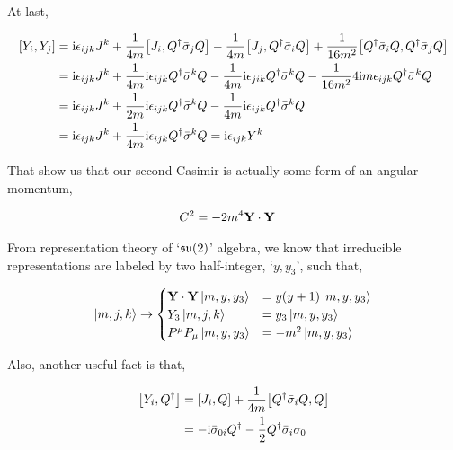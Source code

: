 At last,

\begin{align}
    \comm{Y_i}{Y_j}&=\im\epsilon_{ijk}J^k+\frac{1}{4m}\comm{J_i}{Q^\dagger{\bar\sigma}_j Q}-\frac{1}{4m}\comm{J_j}{Q^\dagger{\bar\sigma}_i Q}+\frac{1}{16m^2}\comm{Q^\dagger{\bar\sigma}_i Q}{Q^\dagger{\bar\sigma}_j Q}\nonumber\\
    &=\im\epsilon_{ijk}J^k+\frac{1}{4m}\im\epsilon_{ijk}Q^\dagger{\bar\sigma^k}Q-\frac{1}{4m}\im\epsilon_{jik}Q^\dagger{\bar\sigma^k}Q-\frac{1}{16m^2}4\im  m\epsilon_{ijk}Q^\dagger{\bar\sigma}^kQ\nonumber\\
    &=\im\epsilon_{ijk}J^k+\frac{1}{2m}\im\epsilon_{ijk}Q^\dagger{\bar\sigma^k}Q-\frac{1}{4m}\im\epsilon_{ijk}Q^\dagger{\bar\sigma}^kQ\nonumber\\
    &=\im\epsilon_{ijk}J^k+\frac{1}{4m}\im\epsilon_{ijk}Q^\dagger{\bar\sigma^k}Q=\im\epsilon_{ijk}Y^k\nonumber
\end{align}

That show us that our second Casimir is actually some form of an angular momentum,

\begin{align}
    C^2&=-2m^4\vb Y\cdot \vb Y\nonumber
\end{align}

From representation theory of `$\mathfrak{su}\qty(2)$' algebra, we know that irreducible representations are labeled 
by two half-integer, `$y,y_3$', such that,

\begin{align}
    \ket{m,j,k}\rightarrow\begin{cases}
        \vb Y\cdot \vb Y\ket{m,y,y_3}&=y\qty(y+1)\ket{m,y,y_3}\\
        Y_3\ket{m,j,k}&=y_3\ket{m,y,y_3}\\
        P^\mu P_\mu\ket{m,y,y_3}&=-m^2\ket{m,y,y_3}
    \end{cases}
\end{align}

Also, another useful fact is that,

\begin{align}
    \comm{Y_i}{Q^\dagger}&=\comm{J_i}{Q}+\frac{1}{4m}\comm{Q^\dagger{\bar\sigma}_iQ}{Q}\nonumber\\
    &=-\im{\bar\sigma}_{0i}Q^\dagger-\frac12Q^\dagger{\bar\sigma}_i\sigma_0\nonumber
\end{align}